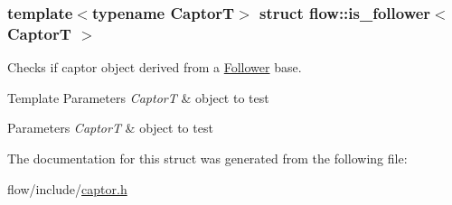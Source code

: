 \subsubsection*{template$<$typename CaptorT$>$\newline
struct flow\+::is\+\_\+follower$<$ Captor\+T $>$}

Checks if captor object derived from a \hyperlink{classflow_1_1_follower}{Follower} base. 


\begin{DoxyTemplParams}{Template Parameters}
{\em CaptorT} & object to test\\
\hline
\end{DoxyTemplParams}

\begin{DoxyParams}{Parameters}
{\em CaptorT} & object to test \\
\hline
\end{DoxyParams}


The documentation for this struct was generated from the following file\+:\begin{DoxyCompactItemize}
\item 
flow/include/\hyperlink{captor_8h}{captor.\+h}\end{DoxyCompactItemize}
